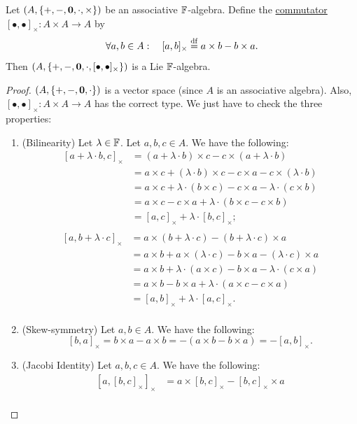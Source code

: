 \documentclass[11pt,reqno]{amsart}
\begin{document}
\begin{Thm}
\label{thm:assoc-to-lie}
Let $(A,\set{+,-,\bm0,\cdot,\times})$ be an associative $\mathbb{F}$-algebra.
Define the \ul{commutator} $[\bullet,\bullet]_\times:A\times A\to A$ by
\[\forall a,b\in A:\quad [a,b]_\times\stackrel{\mathrm{df}}{=} a\times b-b\times a.\]
Then $\Br{A,\set{+,-,\bm0,\cdot,[\bullet,\bullet]_\times}}$ is a Lie $\mathbb{F}$-algebra.
\end{Thm}
\begin{proof}
$(A,\set{+,-,\bm0,\cdot})$ is a vector space (since $A$ is an associative algebra).
Also, $[\bullet,\bullet]_\times:A\times A\to A$ has the correct type.
We just have to check the three properties:
\begin{enumerate}
\item (Bilinearity)
Let $\lambda\in\mathbb{F}$. Let $a,b,c\in A$. We have the following:
\[\begin{aligned}
[a+\lambda\cdot b,c]_\times
&=(a+\lambda\cdot b)\times c-c\times(a+\lambda\cdot b)\\
&=a\times c+(\lambda\cdot b)\times c-c\times a-c\times(\lambda\cdot b)\\
&=a\times c+\lambda\cdot(b\times c)-c\times a-\lambda\cdot(c\times b)\\
&=a\times c-c\times a+\lambda\cdot(b\times c-c\times b)\\
&=[a,c]_\times+\lambda\cdot[b,c]_\times;\\
\end{aligned}\]
\[\begin{aligned}
[a,b+\lambda\cdot c]_\times
&=a\times(b+\lambda\cdot c)-(b+\lambda\cdot c)\times a\\
&=a\times b+a\times(\lambda\cdot c)-b\times a-(\lambda\cdot c)\times a\\
&=a\times b+\lambda\cdot(a\times c)-b\times a-\lambda\cdot(c\times a)\\
&=a\times b-b\times a+\lambda\cdot(a\times c-c\times a)\\
&=[a,b]_\times+\lambda\cdot[a,c]_\times.\\
\end{aligned}\]
\item (Skew-symmetry)
Let $a,b\in A$. We have the following:
\[[b,a]_\times=b\times a-a\times b=-(a\times b-b\times a)=-[a,b]_\times.\]
\item (Jacobi Identity)
Let $a,b,c\in A$. We have the following:
\[\begin{aligned}
[a,[b,c]_\times]_\times
&=a\times[b,c]_\times-[b,c]_\times\times a\\

\end{aligned}\]
\end{enumerate}
\end{proof}
\end{document}
